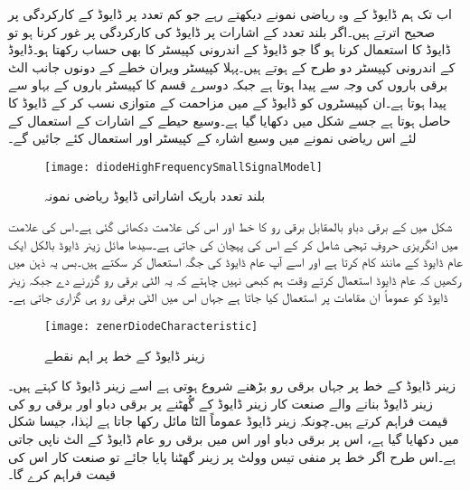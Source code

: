 	اب تک ہم ڈایوڈ کے وہ ریاضی نمونے دیکھتے رہے جو کم تعدد پر ڈایوڈ کے کارکردگی پر صحیح اترتے ہیں۔اگر بلند تعدد کے اشارات پر ڈایوڈ کی کارکردگی پر غور کرنا ہو تو ڈایوڈ کا  استعمال کرنا ہو گا جو ڈایوڈ کے اندرونی کپیسٹر کا بھی حساب رکھتا ہو۔ڈایوڈ کے اندرونی کپیسٹر دو طرح کے ہوتے ہیں۔پہلا کپیسٹر  ویران خطے کے دونوں جانب الٹ برقی باروں کی وجہ سے پیدا ہوتا ہے جبکہ دوسرے قسم کا کپیسٹر   باروں کے بہاو سے پیدا ہوتا ہے۔ان کپیسٹروں کو ڈایوڈ کے  میں مزاحمت  کے متوازی نسب کر کے ڈایوڈ کا 
  حاصل ہوتا ہے جسے شکل  میں دکھایا گیا ہے۔وسیع حیطے کے اشارات کے استعمال کے لئے اس ریاضی نمونے میں وسیع اشارہ کے کپیسٹر  اور   استعمال کئے جائیں گے۔
\begin{figure}
\centering
\texttt{[image: diodeHighFrequencySmallSignalModel]}
\caption{بلند تعدد باریک اشاراتی ڈایوڈ ریاضی نمونہ}
\label{شکل_بلند_تعدد_ڈایوڈ_باریک_اشاراتی_ماڈل}
\end{figure}
شکل   میں  کے برقی دباو بالمقابل برقی رو  کا خط اور اس کی علامت دکھائی گئی ہے۔اس کی علامت میں انگریزی حروفِ تہجی   شامل کر کے اس کی پہچان کی جاتی ہے۔سیدھا مائل زینر ڈایوڈ بالکل ایک عام ڈایوڈ کے مانند کام کرتا ہے اور اسے آپ عام ڈایوڈ کی جگہ استعمال کر سکتے ہیں۔بس یہ ذہن میں رکھیں کہ عام ڈایوڈ استعمال کرتے وقت ہم کبھی نہیں چاہتے کہ یہ الٹی برقی رو گزرنے دے جبکہ زینر ڈایوڈ کو عموماً ان مقامات پر استعمال کیا جاتا ہے جہاں اس میں الٹی برقی رو ہی گزاری جاتی ہے۔
\begin{figure}
\centering
\texttt{[image: zenerDiodeCharacteristic]}
\caption{زینر ڈایوڈ کے خط پر اہم نقطے}
\label{شکل_زینر_ڈایوڈ_کا_خط}
\end{figure}
زینر ڈایوڈ کے خط پر جہاں برقی رو بڑھنے شروع ہوتی ہے اسے زینر ڈایوڈ کا    کہتے ہیں۔ زینر ڈایوڈ  بنانے والے صنعت کار زینر ڈایوڈ کے گُھٹنے پر برقی دباو  اور برقی رو  کی قیمت فراہم کرتے ہیں۔چونکہ زینر ڈایوڈ عموماً الٹا مائل رکھا جاتا ہے لہٰذا، جیسا شکل   میں دکھایا گیا ہے، اس پر برقی دباو اور اس میں برقی رو عام ڈایوڈ کے الٹ ناپی جاتی ہے۔اس طرح اگر خط پر منفی تیس وولٹ  پر زینر گھٹنا پایا جائے تو صنعت کار اس کی قیمت  فراہم کرے گا۔

